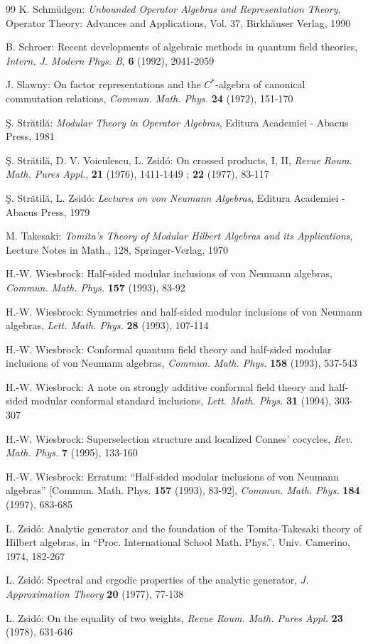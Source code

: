 \documentclass[reqno]{amsart}
\theoremstyle{definition}
\theoremstyle{remark}
\numberwithin{equation}{section}
\theoremstyle{plain}
\begin{document}
\begin{thebibliography}{99}
 K. Schm\"udgen: \emph{Unbounded Operator Algebras
and Representation Theory},
Operator Theory: Advances and Applications, Vol. 37,
Birkh\"auser Verlag, 1990

 B. Schroer: Recent developments of algebraic methods
in quantum field theories, \emph{Intern. J. Modern Phys. B},
\textbf{6} (1992), 2041-2059

 J. Slawny: On factor representations and the
$C^*$-algebra of canonical commutation relations,
\emph{Commun. Math. Phys.} \textbf{24} (1972), 151-170

 \c S. Str\u atil\u a: \emph{Modular Theory in Operator
Algebras}, Editura Academiei - Abacus Press, 1981

 \c S. Str\u atil\u a, D. V. Voiculescu, L. Zsid\'o:
On crossed products, I, II, \emph{Revue Roum. Math. Pures Appl.},
\textbf{21} (1976), 1411-1449 ; \textbf{22} (1977), 83-117

 \c S. Str\u atil\u a, L. Zsid\'o: \emph{Lectures
on von Neumann Algebras}, Editura Academiei - Abacus Press, 1979

 M. Takesaki: \emph{Tomita's Theory of Modular
Hilbert Algebras and its Applications}, Lecture Notes in Math.,
128, Springer-Verlag, 1970

 H.-W. Wiesbrock: Half-sided modular inclusions of
von Neumann algebras, \emph{Commun. Math. Phys.} \textbf{157}
(1993), 83-92

 H.-W. Wiesbrock: Symmetries and half-sided modular
inclusions of von Neumann algebras, \emph{Lett. Math. Phys.}
\textbf{28} (1993), 107-114

 H.-W. Wiesbrock: Conformal quantum field theory and
half-sided modular inclusions of von Neumann algebras,
\emph{Commun. Math. Phys.} \textbf{158} (1993), 537-543

 H.-W. Wiesbrock: A note on strongly additive conformal
field theory and half-sided modular conformal standard inclusions,
\emph{Lett. Math. Phys.} \textbf{31} (1994), 303-307

 H.-W. Wiesbrock: Superselection structure and
localized Connes' cocycles, \emph{Rev. Math. Phys.} \textbf{7}
(1995), 133-160

 H.-W. Wiesbrock: Erratum: ``Half-sided modular
inclusions of von Neumann algebras'' [Commun. Math. Phys.
\textbf{157} (1993), 83-92], \emph{Commun. Math. Phys.} \textbf{184}
(1997), 683-685

 L. Zsid\'o: Analytic generator and the foundation of
the Tomita-Takesaki theory of Hilbert algebras, in ``Proc.
International School Math. Phys.'', Univ. Camerino, 1974, 182-267

 L. Zsid\'o: Spectral and ergodic properties of the
analytic generator, \emph{J. Approximation Theory} \textbf{20}
(1977), 77-138

 L. Zsid\'o: On the equality of two weights, \emph{Revue
Roum. Math. Pures Appl.} \textbf{23} (1978), 631-646


\end{thebibliography}
\end{document}
